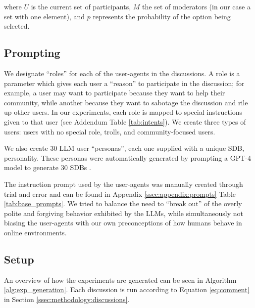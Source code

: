 \noindent where $U$ is the current set of participants, $M$ the set of moderators (in our case a set with one element), and $p$ represents the probability of the option being selected.


\subsection{Prompting}
\label{ssec:experimental:prompts}

We designate “roles” for each of the user-agents in the discussions. A role is a parameter which gives each user a “reason” to participate in the discussion; for example, a user may want to participate because they want to help their community, while another because they want to sabotage the discussion and rile up other users. In our experiments, each role is mapped to special instructions given to that user (see Addendum Table \ref{tab:intents}). We create three types of users: users with no special role, trolls, and community-focused users.

We also create 30 \ac{LLM} user “personas”,  each one supplied with a unique \ac{SDB}, personality. These personas were automatically generated by prompting a GPT-4 model to generate $30$ \acp{SDB} \cite{openai2024gpt4technicalreport}.

The instruction prompt used by the user-agents was manually created through trial and error and can be found in Appendix \ref{ssec:appendix:prompts} Table \ref{tab:base_prompts}. We tried to balance the need to “break out” of the overly polite and forgiving behavior exhibited by the \acp{LLM}, while simultaneously not biasing the user-agents with our own preconceptions of how humans behave in online environments.


\subsection{Setup}

An overview of how the experiments are generated can be seen in Algorithm \ref{alg:exp_generation}. Each discussion is run according to Equation \ref{eq:comment} in Section \ref{ssec:methodology:discussions}. 

